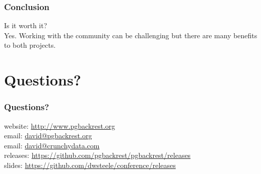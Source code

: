 \begin{frame}
    \frametitle{Conclusion}

    Is it worth it? \pause \\
    \vspace{1em}
    Yes.  Working with the community can be challenging but there are many benefits to both projects.
\end{frame}

\section{Questions?}

\begin{frame}
    \frametitle{Questions?}

    website: \url{http://www.pgbackrest.org}\\
    \vspace{1em}
    email: \href{mailto:david@pgbackrest.org}{david@pgbackrest.org} \\
    email: \href{mailto:david@crunchydata.com}{david@crunchydata.com}\\
    \vspace{1em}
    releases: \url{https://github.com/pgbackrest/pgbackrest/releases}\\
    \vspace{1em}
    slides: \url{https://github.com/dwsteele/conference/releases}\\
\end{frame}


